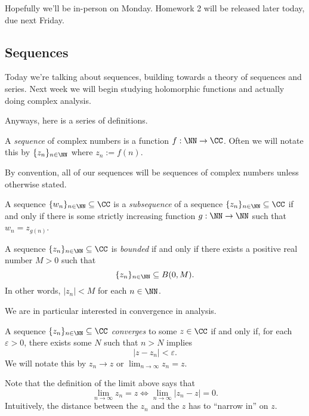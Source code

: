 
Hopefully we'll be in-person on Monday. Homework 2 will be released later today, due next Friday.

\subsection{Sequences}
Today we're talking about sequences, building towards a theory of sequences and series. Next week we will begin studying holomorphic functions and actually doing complex analysis.

Anyways, here is a series of definitions.
\begin{definition}[Sequence]
	A \textit{sequence} of complex numbers is a function $f:\NN\to\CC$. Often we will notate this by $\{z_n\}_{n\in\NN}$ where $z_n:=f(n)$.
\end{definition}
By convention, all of our sequences will be sequences of complex numbers unless otherwise stated.
\begin{definition}[Subsequence]
	A sequence $\{w_n\}_{n\in\NN}\subseteq\CC$ is a \textit{subsequence} of a sequence $\{z_n\}_{n\in\NN}\subseteq\CC$ if and only if there is some strictly increasing function $g:\NN\to\NN$ such that $w_n=z_{g(n)}$.
\end{definition}
\begin{definition}[Bounded]
	A sequence $\{z_n\}_{n\in\NN}\subseteq\CC$ is \textit{bounded} if and only if there exists a positive real number $M>0$ such that
	\[\{z_n\}_{n\in\NN}\subseteq B(0,M).\]
	In other words, $|z_n|<M$ for each $n\in\NN$.
\end{definition}
We are in particular interested in convergence in analysis.
\begin{definition}[Converges]
	A sequence $\{z_n\}_{n\in\NN}\subseteq\CC$ \textit{converges} to some $z\in\CC$ if and only if, for each $\varepsilon>0$, there exists some $N$ such that $n>N$ implies
	\[|z-z_n|<\varepsilon.\]
	We will notate this by $z_n\to z$ or $\lim_{n\to\infty}z_n=z$.
\end{definition}
Note that the definition of the limit above says that
\[\lim_{n\to\infty}z_n=z\iff\lim_{n\to\infty}|z_n-z|=0.\]
Intuitively, the distance between the $z_n$ and the $z$ has to ``narrow in'' on $z$. %

